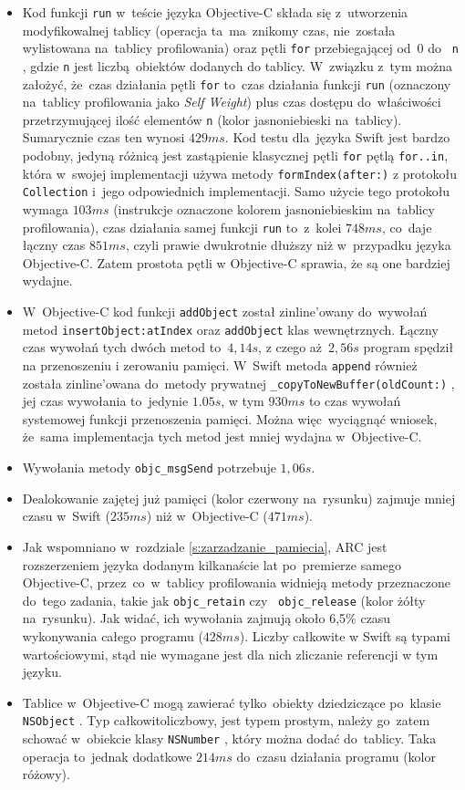 \documentclass[mgr, shortabstract]{iithesis}
\newcommand{\swiftinline}[1]{
    \texttt{#1}
}
\newcommand{\objcinline}[1]{
    \texttt{#1}
}
\begin{document}
\begin{itemize}
    \item Kod funkcji \objcinline{run} w~teście języka Objective-C składa się z~utworzenia modyfikowalnej tablicy (operacja ta~ma~znikomy czas, nie~została wylistowana na~tablicy profilowania) oraz pętli \texttt{for} przebiegającej od~0 do~\objcinline{n}, gdzie \objcinline{n} jest liczbą obiektów dodanych do tablicy. W~związku z~tym można założyć, że~czas działania pętli \texttt{for} to~czas działania funkcji \objcinline{run} (oznaczony na~tablicy profilowania jako \textit{Self Weight}) plus czas dostępu do~właściwości przetrzymującej ilość elementów \objcinline{n} (kolor jasnoniebieski na~tablicy). Sumarycznie czas ten wynosi $429ms$. Kod testu dla~języka Swift jest bardzo podobny, jedyną różnicą jest zastąpienie klasycznej pętli \texttt{for} pętlą \texttt{for..in}, która w~swojej implementacji używa metody \swiftinline{formIndex(after:)} z protokołu \swiftinline{Collection} i~jego odpowiednich implementacji. Samo użycie tego protokołu wymaga $103ms$ (instrukcje oznaczone kolorem jasnoniebieskim na~tablicy profilowania), czas działania samej funkcji \swiftinline{run} to~z~kolei $748ms$, co~daje łączny czas $851ms$, czyli prawie dwukrotnie dłuższy niż w~przypadku języka Objective-C. Zatem prostota pętli w Objective-C sprawia, że są one bardziej wydajne.
    \item W~Objective-C kod funkcji \objcinline{addObject} został zinline'owany do~wywołań metod \objcinline{insertObject:atIndex} oraz \objcinline{addObject} klas wewnętrznych. Łączny czas wywołań tych dwóch metod to~$4,14s$, z czego aż $2,56s$ program spędził na przenoszeniu i zerowaniu pamięci. W~Swift metoda \swiftinline{append} również została zinline'owana do~metody prywatnej \swiftinline{_copyToNewBuffer(oldCount:)}, jej czas wywołania to~jedynie $1.05s$, w tym $930ms$ to czas wywołań systemowej funkcji przenoszenia pamięci. Można więc~wyciągnąć wniosek, że~sama implementacja tych metod jest mniej wydajna w~Objective-C.
    \item Wywołania metody \objcinline{objc_msgSend} potrzebuje $1,06s$.
    \item Dealokowanie zajętej już pamięci (kolor czerwony na~rysunku) zajmuje mniej czasu w~Swift ($235ms$) niż w~Objective-C ($471ms$).
    \item Jak wspomniano w~rozdziale \ref{s:zarzadzanie_pamiecia}, ARC jest rozszerzeniem języka dodanym kilkanaście lat po~premierze samego Objective-C, przez~co~w~tablicy profilowania widnieją metody przeznaczone do~tego zadania, takie jak \objcinline{objc_retain} czy~\objcinline{objc_release} (kolor żółty na~rysunku). Jak widać, ich wywołania zajmują około 6,5\% czasu wykonywania całego programu ($428ms$). Liczby całkowite w Swift są typami wartościowymi, stąd nie wymagane jest dla nich zliczanie referencji w tym języku.
    \item Tablice w~Objective-C mogą zawierać tylko~obiekty dziedziczące po~klasie \objcinline{NSObject}. Typ całkowitoliczbowy, jest typem prostym, należy go~zatem schować w~obiekcie klasy \objcinline{NSNumber}, który można dodać do~tablicy. Taka operacja to~jednak dodatkowe $214ms$ do~czasu działania programu (kolor różowy).
\end{itemize}
\end{document}
